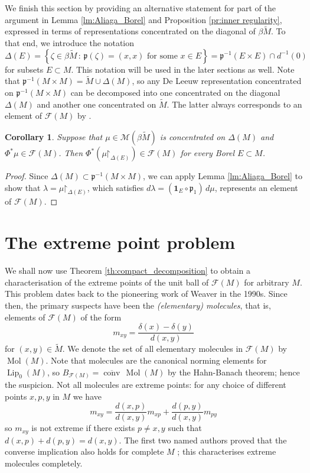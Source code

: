 \documentclass[a4paper,10pt]{amsart}
\DeclareMathOperator{\conv}{conv}                           %
\DeclareMathOperator{\Lip}{Lip}                             %
\newcommand{\set}[1]{\left\{{#1}\right\}}                   %
\newcommand{\cl}[1]{\overline{#1}}                          %
\newcommand{\restrict}{\mathord{\upharpoonright}}           %
\newcommand{\lipfree}[1]{\mathcal{F}({#1})}                 %
\newcommand{\meas}[1]{\mathcal{M}({#1})}                    %
\newcommand{\wt}[1]{\widetilde{#1}}                         %
\newcommand{\bwt}[1]{\beta\wt{#1}}                          %
\newcommand{\pp}{\mathfrak{p}}                              %
\DeclareMathOperator{\Mol}{Mol}                              %
\theoremstyle{plain}
\newtheorem{corollary}[theorem]{Corollary}
\theoremstyle{definition}
\theoremstyle{remark}
\begin{document}
We finish this section by providing an alternative statement for part of the argument in Lemma \ref{lm:Aliaga_Borel} and Proposition \ref{pr:inner regularity}, expressed in terms of representations concentrated on the diagonal of $\bwt{M}$. To that end, we introduce the notation
\begin{equation}\label{eq:Delta notation}
\Delta(E) = \set{ \zeta\in\bwt{M} \,:\, \pp(\zeta)=(x,x) \text{ for some } x\in E }  = \pp^{-1}(E \times E) \cap d^{-1}(0)
\end{equation}
for subsets $E\subset M$. This notation will be used in the later sections as well. Note that $\pp^{-1}(M\times M)=\wt{M}\cup\Delta(M)$, so any De Leeuw representation concentrated on $\pp^{-1}(M\times M)$ can be decomposed into one concentrated on the diagonal $\Delta(M)$ and another one concentrated on $\wt{M}$. The latter always corresponds to an element of $\lipfree{M}$ by \cite[Proposition 2.6]{APS1}.

\begin{corollary}
Suppose that $\mu\in\meas{\bwt{M}}$ is concentrated on $\Delta(M)$ and $\Phi^*\mu\in\lipfree{M}$. Then $\Phi^*(\mu\restrict_{\Delta(E)})\in\lipfree{M}$ for every Borel $E\subset M$.
\end{corollary}

\begin{proof}
Since $\Delta(M)\subset\pp^{-1}(M\times M)$, we can apply Lemma \ref{lm:Aliaga_Borel} to show that $\lambda=\mu\restrict_{\Delta(E)}$, which satisfies $d\lambda = (\mathbf{1}_E\circ\pp_1)\,d\mu$, represents an element of $\lipfree{M}$.
\end{proof}



\section{The extreme point problem}
\label{sec:extreme}

We shall now use Theorem \ref{th:compact_decomposition} to obtain a characterisation of the extreme points of the unit ball of $\lipfree{M}$ for arbitrary $M$. This problem dates back to the pioneering work of Weaver in the 1990s. Since then, the primary suspects have been the \emph{(elementary) molecules}, that is, elements of $\lipfree{M}$ of the form
$$
m_{xy} = \frac{\delta(x)-\delta(y)}{d(x,y)}
$$
for $(x,y)\in\wt{M}$. We denote the set of all elementary molecules in $\lipfree{M}$ by $\Mol(M)$. Note that molecules are the canonical norming elements for $\Lip_0(M)$, so $B_{\lipfree{M}}=\cl{\conv}\,\Mol(M)$ by the Hahn-Banach theorem; hence the suspicion. Not all molecules are extreme points: for any choice of different points $x,p,y$ in $M$ we have
$$
m_{xy} = \frac{d(x,p)}{d(x,y)}m_{xp} + \frac{d(p,y)}{d(x,y)}m_{py}
$$
so $m_{xy}$ is not extreme if there exists $p\neq x,y$ such that $d(x,p)+d(p,y)=d(x,y)$. The first two named authors proved that the converse implication also holds for complete $M$ \cite{AP_rmi}; this characterises extreme molecules completely.
\end{document}
